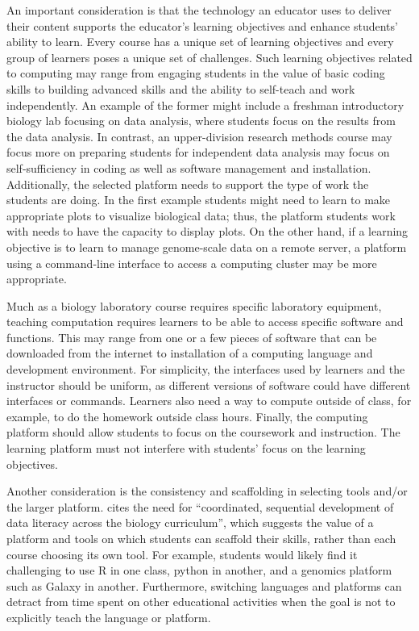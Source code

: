 An important consideration is that the technology an educator uses to deliver their content supports the educator's learning objectives and enhance students' ability to learn. 
Every course has a unique set of learning objectives and
every group of learners poses a unique set of challenges. 
Such learning objectives related to computing may range from engaging students in the value of basic coding skills to building advanced skills and the ability to self-teach and work independently.
An example of the former might include a freshman introductory biology lab focusing on data analysis, where students focus on the results from the data analysis. 
In contrast, an upper-division research methods course may focus more on preparing students for independent data analysis may focus on self-sufficiency in coding as well as software management and installation.
Additionally, the selected platform needs to support the type of work the students are doing.
In the first example students might need to learn to make appropriate plots to visualize biological data; thus, the platform students work with needs to have the capacity to display plots.
On the other hand, if a learning objective is to learn to manage genome-scale data on a remote server, a platform using a command-line interface to access a computing cluster may be more appropriate.

Much as a biology laboratory course requires specific laboratory equipment, teaching computation requires learners to be able to access specific software and functions.
This may range from one or a few pieces of software that can be downloaded from the internet
to installation of a computing language and development environment.
For simplicity,
the interfaces used by learners and the instructor should be uniform, as different versions of software could have different interfaces or commands.
Learners also need  a way to compute outside of class, for example, to do the homework outside class hours.
Finally, the computing platform should allow students to focus on the coursework and instruction. 
The learning platform must not interfere with students' focus on the learning objectives.

Another consideration is the consistency and scaffolding in selecting tools and/or the larger platform.
\citet{Gibson18} cites the need for ``coordinated, sequential development of data literacy across the biology curriculum'',
which suggests the value of a platform and tools on which students can scaffold their skills,
rather than each course choosing its own tool.
For example, students would likely find it challenging to use R in one class,
python in another, and a genomics platform such as Galaxy in another.
 Furthermore, switching languages and platforms
can detract from time spent on other educational activities when the goal is not to explicitly
teach the language or platform.

